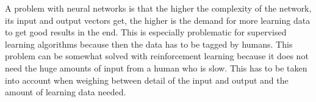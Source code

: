 A problem with neural networks is that the higher the complexity of the network, its input and output vectors get, the higher is the demand for more learning data to get good results in the end. This is especially problematic for supervised learning algorithms because then the data has to be tagged by humans. This problem can be somewhat solved with reinforcement learning because it does not need the huge amounts of input from a human who is slow. This has to be taken into account when weighing between detail of the input and output and the amount of learning data needed.